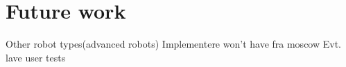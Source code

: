 \chapter{Future work}
Other robot types(advanced robots)
Implementere won't have fra moscow
Evt. lave user tests

